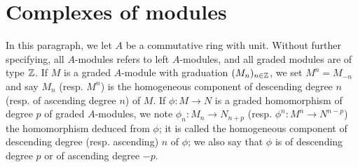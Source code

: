 \section{Complexes of modules}
In this paragraph, we let $A$ be a commutative ring with unit. Without further specifying, all $A$-modules refers to left $A$-modules, and all graded modules are of type $\mathbb{Z}$. If $M$ is a graded $A$-module with graduation $(M_n)_{n\in\mathbb{Z}}$, we set $M^n=M_{-n}$ and say $M_n$ (resp. $M^n$) is the homogeneous component of descending degree $n$ (resp. of ascending degree $n$) of $M$. If $\phi:M\to N$ is a graded homomorphism of degree $p$ of graded $A$-modules, we note $\phi_n:M_n\to N_{n+p}$ (resp. $\phi^n:M^n\to N^{n-p}$) the homomorphism deduced from $\phi$; it is called the homogeneous component of descending degree (resp. ascending) $n$ of $\phi$; we also say that $\phi$ is of descending degree $p$ or of ascending degree $-p$.
